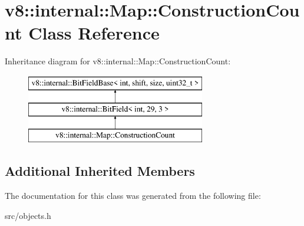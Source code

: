 \hypertarget{classv8_1_1internal_1_1_map_1_1_construction_count}{}\section{v8\+:\+:internal\+:\+:Map\+:\+:Construction\+Count Class Reference}
\label{classv8_1_1internal_1_1_map_1_1_construction_count}
Inheritance diagram for v8\+:\+:internal\+:\+:Map\+:\+:Construction\+Count\+:\begin{figure}[H]
\begin{center}
\leavevmode
\includegraphics[height=3.000000cm]{classv8_1_1internal_1_1_map_1_1_construction_count}
\end{center}
\end{figure}
\subsection*{Additional Inherited Members}


The documentation for this class was generated from the following file\+:\begin{DoxyCompactItemize}
\item 
src/objects.\+h\end{DoxyCompactItemize}
